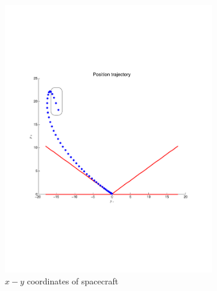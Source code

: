 \documentclass[openany]{now}
\begin{document}
\begin{figure}
        \centering
        \begin{subfigure}[b]{0.5\textwidth}
                \includegraphics[width=\textwidth]{Figures/states}
                \caption{$x-y$ coordinates of spacecraft}
                \label{fig:soft-landing-state}
        \end{subfigure}%
        ~ %
        \begin{subfigure}[b]{0.5\textwidth}

\end{subfigure}
\end{figure}
\end{document}
